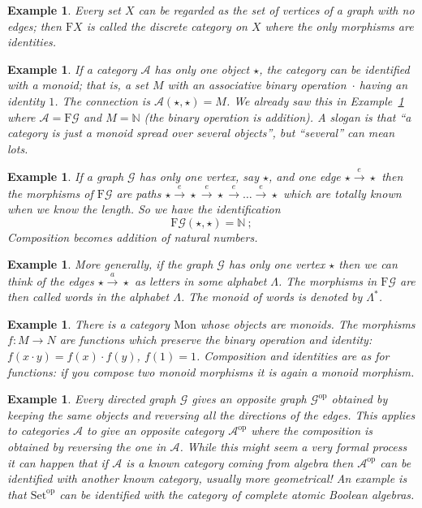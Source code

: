 \documentclass[a4paper,12pt]{article}
\newtheorem{example}[theorem]{Example}
\theoremstyle{step}
\newcommand{\xra}{\xrightarrow}
\def\CA{{\mathscr A}}
\def\CG{{\mathscr G}}
\begin{document}
\begin{example} \label{discretecat} Every set $X$ can be regarded as the set of vertices of a graph with no edges; then $\mathrm{F}X$ is called
the {\em discrete category on $X$} where the only morphisms are identities.
\end{example}
\begin{example} \label{MonoidDef}
If a category $\CA$ has only one object $\star$, the category can be identified with a {\em monoid}; that is, a set $M$ with an associative binary operation~$\cdot$ having an identity $1$. The connection is $\CA(\star,\star) = M$. We already saw this in Example~\ref{onevertex} where $\CA=\mathrm{F}\CG$ and $M= \mathbb{N}$ (the binary operation is addition).
A slogan is that ``a category is just a monoid spread over several objects'', but ``several'' can mean lots.  
\end{example}
\begin{example}\label{onevertex} 
If a graph $\CG$ has only one vertex, say $\star$, and one edge $\star\xra{e} \star$ then the morphisms of $\mathrm{F}\CG$ are paths $\star\xra{e} \star \xra{e} \star\xra{e} \dots \xra{e} \star$ which are
totally known when we know the length. So we have the identification 
$$\mathrm{F}\CG(\star,\star) = \mathbb{N} \ ;$$ 
Composition becomes addition of natural numbers.
\end{example}
\begin{example}\label{alphabet} More generally, if the graph $\CG$ has only one vertex $\star$ then we can think of the edges $\star\xra{a} \star$
as letters in some {\em alphabet} $\Lambda$. The morphisms in $\mathrm{F}\CG$ are then called {\em words} in the alphabet $\Lambda$. The monoid of words is denoted by $\Lambda^*$.    
\end{example}

\begin{example} There is a category $\mathrm{Mon}$ whose objects are monoids. The morphisms
$f : M\to N$ are functions which preserve the binary operation and identity: $f(x\cdot y) = f(x)\cdot f(y)$,
$f(1) = 1$. Composition and identities are as for functions: if you compose two monoid morphisms it is again a monoid morphism. 
\end{example}

\begin{example} Every directed graph $\CG$ gives an {\em opposite graph} $\CG^{\mathrm{op}}$
obtained by keeping the same objects and reversing all the directions of the edges. This applies to
categories $\CA$ to give an {\em opposite category} $\CA^{\mathrm{op}}$ where the composition is obtained by reversing the one in $\CA$. While this might seem a very formal process it can happen
that if $\CA$ is a known category coming from algebra then $\CA^{\mathrm{op}}$ can be identified
with another known category, usually more geometrical! An example is that $\mathrm{Set}^{\mathrm{op}}$ can be identified with the category of complete atomic Boolean algebras.   
\end{example}
\end{document}
